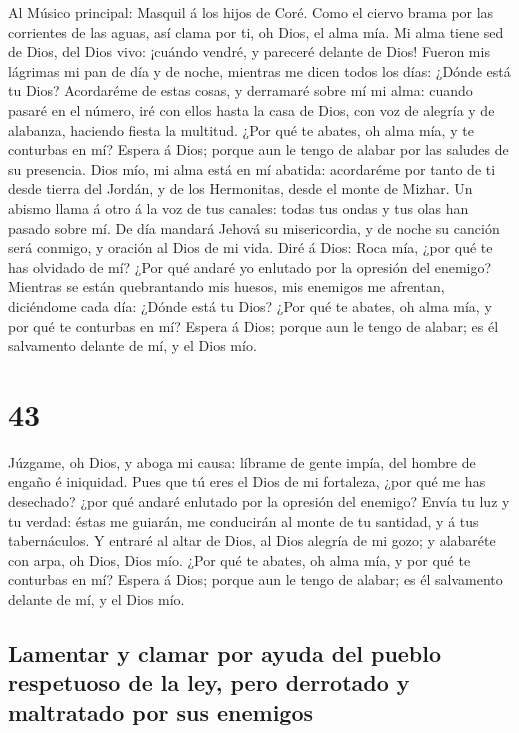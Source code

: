  Al Músico principal: Masquil á los hijos de Coré. Como el
ciervo brama por las corrientes de las aguas, así clama por ti, oh Dios,
el alma mía.  Mi alma tiene sed de Dios, del Dios vivo:
¡cuándo vendré, y pareceré delante de Dios!  Fueron mis
lágrimas mi pan de día y de noche, mientras me dicen todos los días:
¿Dónde está tu Dios?  Acordaréme de estas cosas, y
derramaré sobre mí mi alma: cuando pasaré en el número, iré con ellos
hasta la casa de Dios, con voz de alegría y de alabanza, haciendo fiesta
la multitud.  ¿Por qué te abates, oh alma mía, y te
conturbas en mí? Espera á Dios; porque aun le tengo de alabar por las
saludes de su presencia.  Dios mío, mi alma está en mí
abatida: acordaréme por tanto de ti desde tierra del Jordán, y de los
Hermonitas, desde el monte de Mizhar.  Un abismo llama á
otro á la voz de tus canales: todas tus ondas y tus olas han pasado
sobre mí.  De día mandará Jehová su misericordia, y de
noche su canción será conmigo, y oración al Dios de mi vida.
 Diré á Dios: Roca mía, ¿por qué te has olvidado de mí?
¿Por qué andaré yo enlutado por la opresión del enemigo? 
Mientras se están quebrantando mis huesos, mis enemigos me afrentan,
diciéndome cada día: ¿Dónde está tu Dios?  ¿Por qué te
abates, oh alma mía, y por qué te conturbas en mí? Espera á Dios; porque
aun le tengo de alabar; es él salvamento delante de mí, y el Dios mío.

\hypertarget{section-42}{%
\section{43}\label{section-42}}

 Júzgame, oh Dios, y aboga mi causa: líbrame de gente
impía, del hombre de engaño é iniquidad.  Pues que tú eres
el Dios de mi fortaleza, ¿por qué me has desechado? ¿por qué andaré
enlutado por la opresión del enemigo?  Envía tu luz y tu
verdad: éstas me guiarán, me conducirán al monte de tu santidad, y á tus
tabernáculos.  Y entraré al altar de Dios, al Dios alegría
de mi gozo; y alabaréte con arpa, oh Dios, Dios mío.  ¿Por
qué te abates, oh alma mía, y por qué te conturbas en mí? Espera á Dios;
porque aun le tengo de alabar; es él salvamento delante de mí, y el Dios
mío.

\hypertarget{lamentar-y-clamar-por-ayuda-del-pueblo-respetuoso-de-la-ley-pero-derrotado-y-maltratado-por-sus-enemigos}{%
\subsection{Lamentar y clamar por ayuda del pueblo respetuoso de la ley,
pero derrotado y maltratado por sus
enemigos}\label{lamentar-y-clamar-por-ayuda-del-pueblo-respetuoso-de-la-ley-pero-derrotado-y-maltratado-por-sus-enemigos}}

